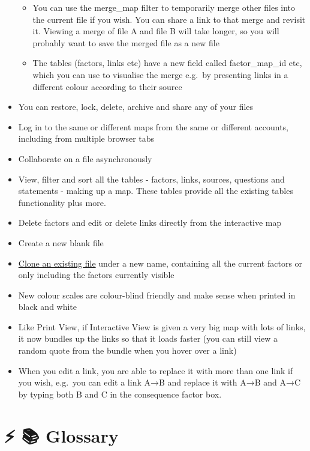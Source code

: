 \documentclass[
]{book}
\providecommand{\tightlist}{%
  \setlength{\itemsep}{0pt}\setlength{\parskip}{0pt}}
\begin{document}
\begin{itemize}
  \begin{itemize}
  \tightlist
  \item
    You can use the merge\_map filter to temporarily merge other files into the current file if you wish. You can share a link to that merge and revisit it. Viewing a merge of file A and file B will take longer, so you will probably want to save the merged file as a new file
  \item
    The tables (factors, links etc) have a new field called factor\_map\_id etc, which you can use to visualise the merge e.g.~by presenting links in a different colour according to their source
  \end{itemize}
\item
  You can restore, lock, delete, archive and share any of your files
\item
  Log in to the same or different maps from the same or different accounts, including from multiple browser tabs
\item
  Collaborate on a file asynchronously
\item
  View, filter and sort all the tables - factors, links, sources, questions and statements - making up a map. These tables provide all the existing tables functionality plus more.
\item
  Delete factors and edit or delete links directly from the interactive map
\item
  Create a new blank file
\item
  \protect\hyperlink{xown-copy}{Clone an existing file} under a new name, containing all the current factors or only including the factors currently visible
\item
  New colour scales are colour-blind friendly and make sense when printed in black and white
\item
  Like Print View, if Interactive View is given a very big map with lots of links, it now bundles up the links so that it loads faster (you can still view a random quote from the bundle when you hover over a link)
\item
  When you edit a link, you are able to replace it with more than one link if you wish, e.g.~you can edit a link A→B and replace it with A→B and A→C by typing both B and C in the consequence factor box.
\end{itemize}

\hypertarget{glossary}{%
\chapter{⚡ 📚 Glossary}\label{glossary}}
\end{document}
